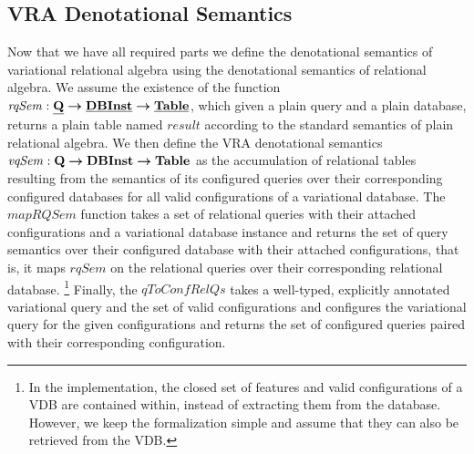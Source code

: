 \subsection{VRA Denotational Semantics }
\label{sec:vradensem}


Now that we have all required parts we define the denotational semantics of 
variational relational algebra using the denotational semantics of relational 
algebra. 
We assume the existence of the function
$\mathit{rqSem} : \pQSet \totype \pInstSet \totype \pTabSet$, which given a plain query and
a plain database, returns a plain table named $\mathit{result}$
according to the standard semantics of plain relational algebra.
%
We then define the VRA denotational semantics 
$\mathit{vqSem} : \qSet \totype \vdbInstSet \totype \tabletype$ as the 
accumulation of relational tables resulting from the semantics of its
configured queries over their corresponding configured databases for all 
valid configurations of a variational database. 
%
The $\mathit{mapRQSem}$ function takes a set of relational queries with their attached
configurations and a variational database instance and returns the set of query 
semantics over their configured database
with their attached configurations, that is, it maps $\mathit{rqSem}$ on the 
relational queries over their corresponding relational database.%
\footnote{In the implementation, the closed set of features and valid configurations
of a VDB are contained within, instead of extracting them from the database. However,
we keep the formalization simple and assume that they can also be retrieved from
the VDB.}
%
Finally, the $\mathit{qToConfRelQs}$ takes a well-typed, explicitly annotated 
variational query and the set of valid configurations and configures the variational
query for the given configurations and returns the set of configured queries paired 
with their corresponding configuration.





